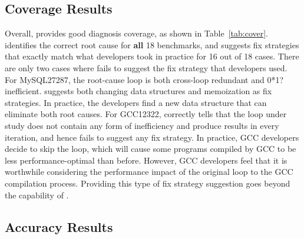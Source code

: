 \subsection{Coverage Results}
\label{sec:coverage}
Overall, \Tool provides good diagnosis coverage, as shown in Table~\ref{tab:cover}. 
\Tool identifies the correct root cause for \textbf{all} 18 benchmarks, and 
suggests fix strategies that exactly match what developers took in practice
for 16 out of 18 cases. There are only two cases where \Tool fails to suggest
the fix strategy that developers used. For MySQL27287, the root-cause loop
is both cross-loop redundant and 0*1? inefficient. \Tool suggests both changing
data structures and memoization as fix strategies. In practice, the developers
find a new data structure that can eliminate both root causes.
For GCC12322, \Tool correctly tells that the loop under study
does not contain any form of inefficiency and produce results in every 
iteration, and hence fails to suggest any fix strategy. In practice, GCC
developers decide to skip the loop, which will cause some programs compiled by
GCC
to be less performance-optimal than before. However, GCC developers feel
that it is worthwhile considering the performance impact of the original loop
to the GCC compilation process.
Providing this type of
fix strategy suggestion goes beyond the capability of \Tool.

\subsection{Accuracy Results}
\label{sec:result_acc}

